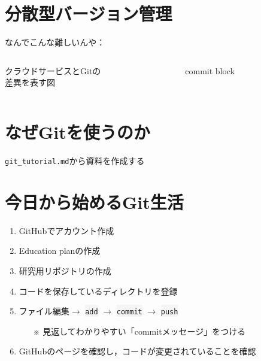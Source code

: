 \documentclass[12pt,dvipdfmx,svgnames,uplatex,aspectratio=169]{beamer}
\newcommand{\git}[1]{{\colorbox{WhiteSmoke}{\texttt{#1}}}}  %
\begin{document}
\section{分散型バージョン管理}
\begin{frame}{なんでこんな難しいんや：\insertsection}
  \begin{columns}[c] %
    \begin{column}{0.5\textwidth}
      \begin{screen}
        クラウドサービスとGitの\\差異を表す図
      \end{screen}
    \end{column}
    \begin{column}{0.5\textwidth}
      \begin{block}{commit}
        block
      \end{block}
    \end{column}
  \end{columns}
\end{frame}

\section{なぜGitを使うのか}
\begin{frame}{\insertsection}
  \texttt{git\_tutorial.md}から資料を作成する
\end{frame}

\section{今日から始めるGit生活}
\begin{frame}{\insertsection}
  \begin{enumerate}
    \item GitHubでアカウント作成
    \item Education planの作成
    \item 研究用リポジトリの作成
    \item コードを保存しているディレクトリを登録
    \item ファイル編集\(\to\) \git{add} \(\to\) \git{commit} \(\to\) \git{push}
    \begin{itemize}
      \item[※] 見返してわかりやすい「commitメッセージ」をつける
    \end{itemize}
    \item GitHubのページを確認し，コードが変更されていることを確認
  \end{enumerate}
\end{frame}
\end{document}
